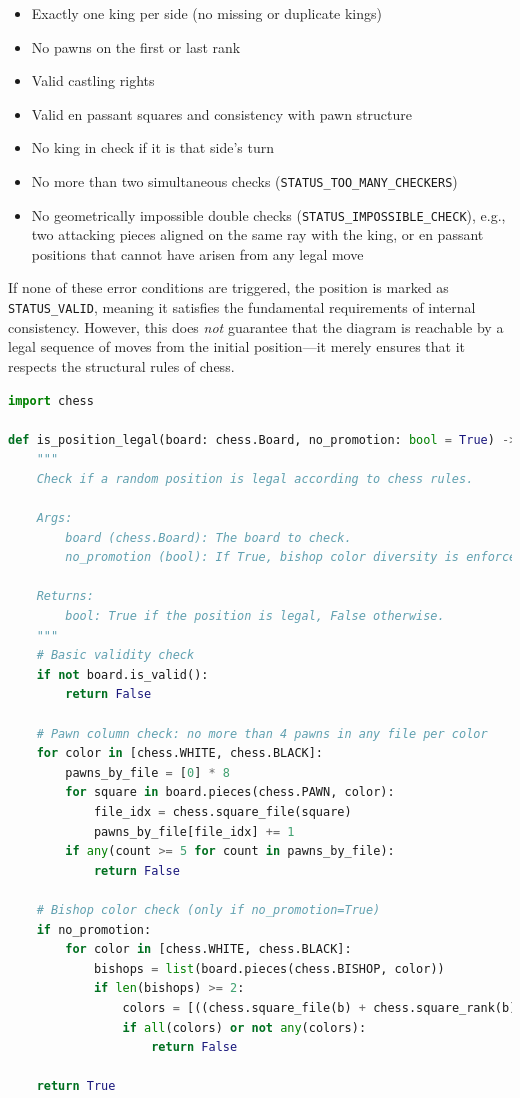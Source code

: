 \documentclass[12pt]{article}
\begin{document}
\begin{itemize}
    \item Exactly one king per side (no missing or duplicate kings)
    \item No pawns on the first or last rank
    \item Valid castling rights
    \item Valid en passant squares and consistency with pawn structure
    \item No king in check if it is that side’s turn
    \item No more than two simultaneous checks (\texttt{STATUS\_TOO\_MANY\_CHECKERS})
    \item No geometrically impossible double checks (\texttt{STATUS\_IMPOSSIBLE\_CHECK}), 
          e.g., two attacking pieces aligned on the same ray with the king,
          or en passant positions that cannot have arisen from any legal move
\end{itemize}

\noindent
If none of these error conditions are triggered, the position is marked as 
\texttt{STATUS\_VALID}, meaning it satisfies the fundamental requirements of internal consistency.
However, this does \emph{not} guarantee that the diagram is reachable by a legal sequence of moves from the initial position---it merely ensures that it respects the structural rules of chess.

\begin{lstlisting}[language=Python, caption={Validation of chess positions using python-chess}, label={lst:is_legal}]
import chess

def is_position_legal(board: chess.Board, no_promotion: bool = True) -> bool:
    """
    Check if a random position is legal according to chess rules.

    Args:
        board (chess.Board): The board to check.
        no_promotion (bool): If True, bishop color diversity is enforced.

    Returns:
        bool: True if the position is legal, False otherwise.
    """
    # Basic validity check
    if not board.is_valid():
        return False

    # Pawn column check: no more than 4 pawns in any file per color
    for color in [chess.WHITE, chess.BLACK]:
        pawns_by_file = [0] * 8
        for square in board.pieces(chess.PAWN, color):
            file_idx = chess.square_file(square)
            pawns_by_file[file_idx] += 1
        if any(count >= 5 for count in pawns_by_file):
            return False

    # Bishop color check (only if no_promotion=True)
    if no_promotion:
        for color in [chess.WHITE, chess.BLACK]:
            bishops = list(board.pieces(chess.BISHOP, color))
            if len(bishops) >= 2:
                colors = [((chess.square_file(b) + chess.square_rank(b)) % 2 == 0) for b in bishops]
                if all(colors) or not any(colors):
                    return False

    return True
\end{lstlisting}
\end{document}
